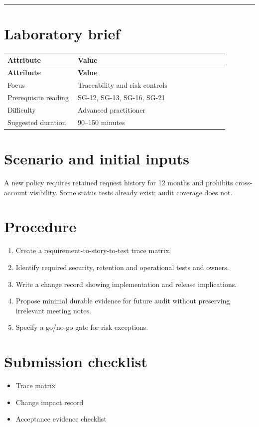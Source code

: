 \documentclass[11pt,letterpaper]{article}
\begin{document}
\tableofcontents\medskip\noindent\rule{\linewidth}{0.4pt}\medskip
\section{Laboratory brief}
\begin{longtable}{|p{0.28\linewidth}|p{0.60\linewidth}|}\hline
\textbf{Attribute} & \textbf{Value} \\ \hline\endfirsthead\hline
\textbf{Attribute} & \textbf{Value} \\ \hline\endhead
Focus & Traceability and risk controls \\ \hline
Prerequisite reading & SG-12, SG-13, SG-16, SG-21 \\ \hline
Difficulty & Advanced practitioner \\ \hline
Suggested duration & 90–150 minutes \\ \hline
\end{longtable}
\section{Scenario and initial inputs}
A new policy requires retained request history for 12 months and prohibits cross-account visibility. Some status tests already exist; audit coverage does not.

\section{Procedure}
\begin{enumerate}[leftmargin=*,itemsep=3pt]
\item Create a requirement-to-story-to-test trace matrix.
\item Identify required security, retention and operational tests and owners.
\item Write a change record showing implementation and release implications.
\item Propose minimal durable evidence for future audit without preserving irrelevant meeting notes.
\item Specify a go/no-go gate for risk exceptions.
\end{enumerate}
\section{Submission checklist}
\begin{itemize}[leftmargin=*,itemsep=2pt]
\item Trace matrix
\item Change impact record
\item Acceptance evidence checklist
\end{itemize}
\end{document}
